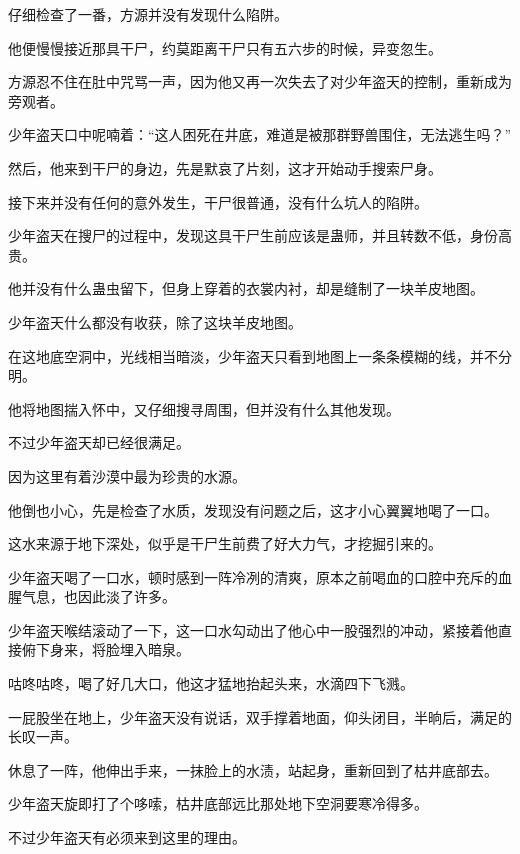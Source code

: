 
\begin{this_body}



仔细检查了一番，方源并没有发现什么陷阱。

他便慢慢接近那具干尸，约莫距离干尸只有五六步的时候，异变忽生。

方源忍不住在肚中咒骂一声，因为他又再一次失去了对少年盗天的控制，重新成为旁观者。

少年盗天口中呢喃着：“这人困死在井底，难道是被那群野兽围住，无法逃生吗？”

然后，他来到干尸的身边，先是默哀了片刻，这才开始动手搜索尸身。

接下来并没有任何的意外发生，干尸很普通，没有什么坑人的陷阱。

少年盗天在搜尸的过程中，发现这具干尸生前应该是蛊师，并且转数不低，身份高贵。

他并没有什么蛊虫留下，但身上穿着的衣裳内衬，却是缝制了一块羊皮地图。

少年盗天什么都没有收获，除了这块羊皮地图。

在这地底空洞中，光线相当暗淡，少年盗天只看到地图上一条条模糊的线，并不分明。

他将地图揣入怀中，又仔细搜寻周围，但并没有什么其他发现。

不过少年盗天却已经很满足。

因为这里有着沙漠中最为珍贵的水源。

他倒也小心，先是检查了水质，发现没有问题之后，这才小心翼翼地喝了一口。

这水来源于地下深处，似乎是干尸生前费了好大力气，才挖掘引来的。

少年盗天喝了一口水，顿时感到一阵冷冽的清爽，原本之前喝血的口腔中充斥的血腥气息，也因此淡了许多。

少年盗天喉结滚动了一下，这一口水勾动出了他心中一股强烈的冲动，紧接着他直接俯下身来，将脸埋入暗泉。

咕咚咕咚，喝了好几大口，他这才猛地抬起头来，水滴四下飞溅。

一屁股坐在地上，少年盗天没有说话，双手撑着地面，仰头闭目，半晌后，满足的长叹一声。

休息了一阵，他伸出手来，一抹脸上的水渍，站起身，重新回到了枯井底部去。

少年盗天旋即打了个哆嗦，枯井底部远比那处地下空洞要寒冷得多。

不过少年盗天有必须来到这里的理由。


\end{this_body}
